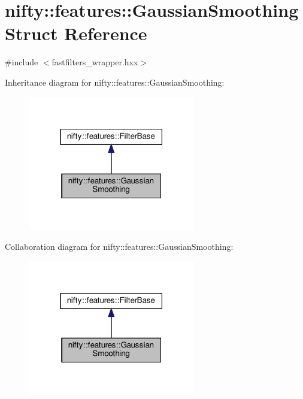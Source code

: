 \hypertarget{structnifty_1_1features_1_1GaussianSmoothing}{}\section{nifty\+:\+:features\+:\+:Gaussian\+Smoothing Struct Reference}
\label{structnifty_1_1features_1_1GaussianSmoothing}


{\ttfamily \#include $<$fastfilters\+\_\+wrapper.\+hxx$>$}



Inheritance diagram for nifty\+:\+:features\+:\+:Gaussian\+Smoothing\+:
\nopagebreak
\begin{figure}[H]
\begin{center}
\leavevmode
\includegraphics[width=207pt]{structnifty_1_1features_1_1GaussianSmoothing__inherit__graph}
\end{center}
\end{figure}


Collaboration diagram for nifty\+:\+:features\+:\+:Gaussian\+Smoothing\+:
\nopagebreak
\begin{figure}[H]
\begin{center}
\leavevmode
\includegraphics[width=207pt]{structnifty_1_1features_1_1GaussianSmoothing__coll__graph}
\end{center}
\end{figure}
